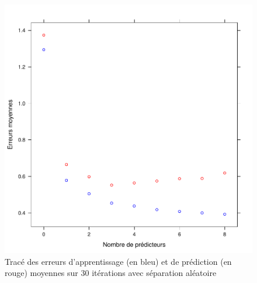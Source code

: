 \documentclass[a4paper, 12pt]{article}
\begin{document}
\begin{figure}
\begin{center}
\includegraphics[scale=1]{erreurs_moy_moy.pdf}
\caption{Tracé des erreurs d'apprentissage (en bleu) et de prédiction (en rouge) moyennes sur 30 itérations avec séparation aléatoire}
\end{center}
\end{figure}
\end{document}
